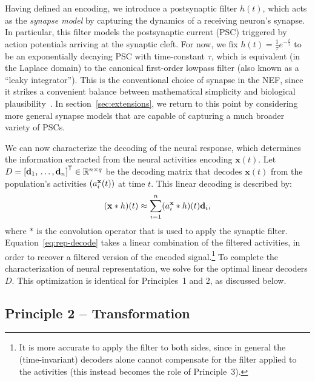 \documentclass[12pt]{article}
\theoremstyle{definition}
\renewcommand{\vec}{\mathbf}  %
\newcommand{\transpose}[1]{{#1}^\mathsf{T}}
\let\originalleft\left
\let\originalright\right
\renewcommand{\left}{\mathopen{}\mathclose\bgroup\originalleft}
\renewcommand{\right}{\aftergroup\egroup\originalright}
\begin{document}
Having defined an encoding, we introduce a postsynaptic filter $h(t)$, which acts as the \emph{synapse model} by capturing the dynamics of a receiving neuron's synapse.
In particular, this filter models the postsynaptic current (PSC) triggered by action potentials arriving at the synaptic cleft.
For now, we fix $h(t) = \frac{1}{\tau} e^{-\frac{t}{\tau}}$ to be an exponentially decaying PSC with time-constant $\tau$, which is equivalent (in the Laplace domain) to the canonical first-order lowpass filter (also known as a ``leaky integrator'').
This is the conventional choice of synapse in the NEF, since it strikes a convenient balance between mathematical simplicity and biological plausibility~\citep{eliasmith2003neural}.
In section~\ref{sec:extensions}, we return to this point by considering more general synapse models that are capable of capturing a much broader variety of PSCs.

We can now characterize the decoding of the neural response, which determines the information extracted from the neural activities encoding $\vec{x}(t)$.
Let $D = \transpose{\left[ \vec{d}_1\text{,}\, \ldots\text{,}\, \vec{d}_n \right]} \in \mathbb{R}^{n \times q}$ be the decoding matrix that decodes $\vec{x}(t)$ from the population's activities $\left( a_i^\vec{x}(t) \right)$ at time $t$.
This linear decoding is described by:
\begin{equation} \label{eq:rep-decode}
\left(\vec{x} \ast h \right)(t) \approx \sum_{i=1}^n (a_i^\vec{x} \ast h)(t) \vec{d}_i \text{,}
\end{equation}
where $\ast$ is the convolution operator that is used to apply the synaptic filter.
Equation~\ref{eq:rep-decode} takes a linear combination of the filtered activities, in order to recover a filtered version of the encoded signal.\footnote{It is more accurate to apply the filter to both sides, since in general the (time-invariant) decoders alone cannot compensate for the filter applied to the activities (this instead becomes the role of Principle~3).}
To complete the characterization of neural representation, we solve for the optimal linear decoders $D$.
This optimization is identical for Principles~1 and 2, as discussed below.

\subsection{Principle 2 -- Transformation}
\label{sec:principle2}
\end{document}
